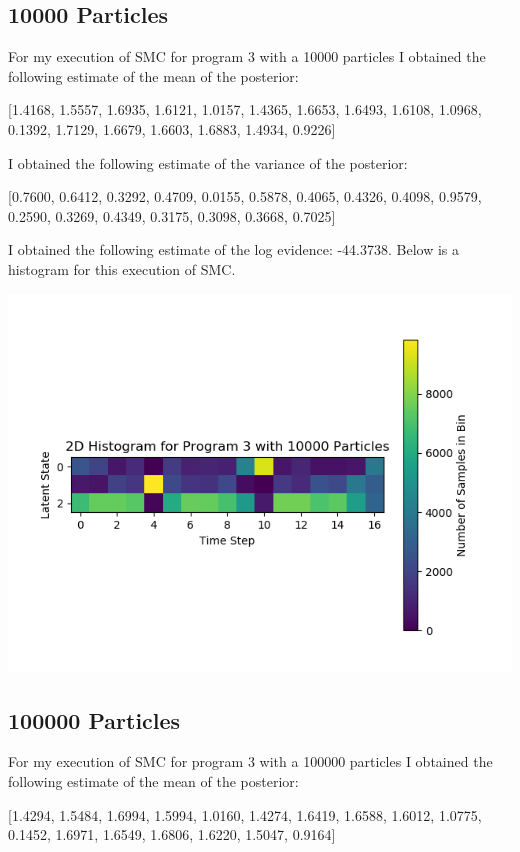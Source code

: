 \documentclass[11pt]{article}
\theoremstyle{definition}
\begin{document}
\subsection{10000 Particles}

For my execution of SMC for program 3 with a 10000 particles I obtained the following estimate of the mean of the posterior:

[1.4168, 1.5557, 1.6935, 1.6121, 1.0157, 1.4365, 1.6653, 1.6493, 1.6108, 1.0968, 0.1392, 1.7129, 1.6679, 1.6603, 1.6883, 1.4934, 0.9226]

I obtained the following estimate of the variance of the posterior:

[0.7600, 0.6412, 0.3292, 0.4709, 0.0155, 0.5878, 0.4065, 0.4326, 0.4098, 0.9579, 0.2590, 0.3269, 0.4349, 0.3175, 0.3098, 0.3668, 0.7025]

I obtained the following estimate of the log evidence:  -44.3738. Below is a histogram for this execution of SMC.

\begin{center}
\includegraphics[scale=0.5]{../plots/P3NP10000.png}
\end{center}

\subsection{100000 Particles}


For my execution of SMC for program 3 with a 100000 particles I obtained the following estimate of the mean of the posterior:

[1.4294, 1.5484, 1.6994, 1.5994, 1.0160, 1.4274, 1.6419, 1.6588, 1.6012, 1.0775, 0.1452, 1.6971, 1.6549, 1.6806, 1.6220, 1.5047, 0.9164]
\end{document}
